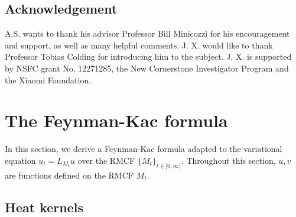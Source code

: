 \documentclass[12pt]{amsart}
\numberwithin{equation}{section}
\numberwithin{equation}{section}
\begin{document}
	\subsection*{Acknowledgement}
	A.S. wants to thank his advisor Professor Bill Minicozzi for his encouragement and support, as well as many helpful comments. J. X. would like to thank Professor Tobias Colding for introducing him to the subject. J. X. is supported by NSFC grant No. 12271285, the New Cornerstone Investigator Program and the Xiaomi Foundation.
	
	
	\section{The Feynman-Kac formula}\label{S:FK}
	In this section, we derive a Feynman-Kac formula adapted to the variational equation $u_t=L_{M_t} u$ over the RMCF $\{M_t\}_{t\in[0,\infty)}$. Throughout this section, $u,v$ are functions defined on the RMCF $M_t$. 
	
	\subsection{Heat kernels}\label{SSHeat}
	
\end{document}
